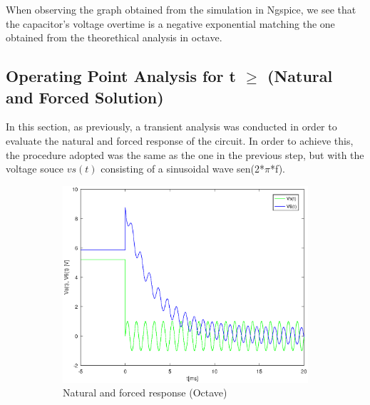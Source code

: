  When observing the graph obtained from the simulation in Ngspice, we see that the capacitor's voltage overtime is a negative exponential matching the one obtained from the theorethical analysis in octave.
 
\subsection{Operating Point Analysis for t $\geq$ (Natural and Forced Solution)}
In this section, as previously, a transient analysis was conducted in order to evaluate the natural and forced response of the circuit. In order to achieve this, the procedure adopted was the same as the one in the previous step, but with the voltage souce $vs(t)$ consisting of a sinusoidal wave sen(2*$\pi$*f).  

\begin{figure}[h] 
\centering
\begin{subfigure}{0.5\textwidth}
\includegraphics[width=\textwidth]{Solution.eps}
\caption{Natural and forced response (Octave)}
\label{fig:first}
\end{subfigure}
\begin{subfigure}{0.42\textwidth}

\end{subfigure}
\end{figure}
